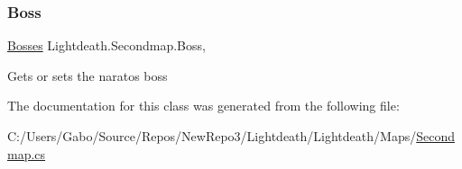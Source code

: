 \subsubsection{\texorpdfstring{Boss}{Boss}}
{\footnotesize\ttfamily \hyperlink{class_lightdeath_1_1_bosses}{Bosses} Lightdeath.\+Secondmap.\+Boss\hspace{0.3cm}{\ttfamily [get]}, {\ttfamily [set]}}



Gets or sets the naratos boss 



The documentation for this class was generated from the following file\+:\begin{DoxyCompactItemize}
\item 
C\+:/\+Users/\+Gabo/\+Source/\+Repos/\+New\+Repo3/\+Lightdeath/\+Lightdeath/\+Maps/\hyperlink{_secondmap_8cs}{Secondmap.\+cs}\end{DoxyCompactItemize}
